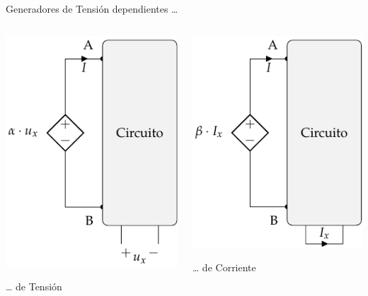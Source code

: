 \documentclass[xcolor={usenames,svgnames,dvipsnames}]{beamer}
\begin{document}
\begin{frame}[label={sec:orgc62e3b6}]{Generadores de Tensión dependientes \ldots{}}
\begin{columns}
\begin{column}{0.5\columnwidth}
  \begin{center}
\includegraphics[height=0.7\textheight]{figs/FuenteTensionDependienteTension.pdf}
\end{center}
\ldots{} de Tensión
\end{column}
\begin{column}{0.5\columnwidth}
  \begin{center}
\includegraphics[height=0.7\textheight]{figs/FuenteTensionDependienteCorriente.pdf}
\end{center}
\ldots{} de Corriente
\end{column}
\end{columns}
\end{frame}
\end{document}
